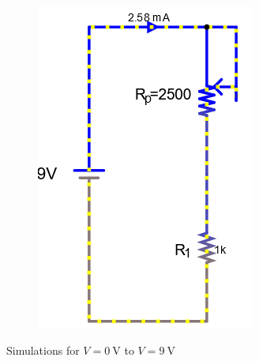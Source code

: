 \documentclass[a4paper]{article}
\begin{document}
\begin{figure}[H]
\begin{subfigure}{0.333\textwidth}
        \includegraphics[width=.9\linewidth]{amp9}
    \end{subfigure}
    \caption{Simulations for $V=\SI{0}{\volt}$ to $V=\SI{9}{\volt}$ }
    \label{fig:1}
\end{figure}
\end{document}
